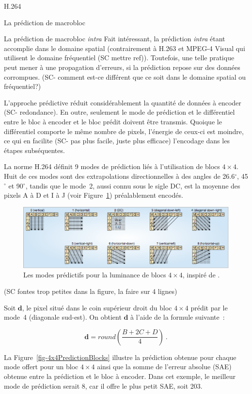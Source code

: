 \documentclass{article}
\begin{document}
\begin{section}{H.264}
\begin{subsection}{La prédiction de macrobloc}
\begin{subsubsection}{La prédiction de macrobloc \textit{intra}}
Fait intéressant, la prédiction \textit{intra} étant accomplie dans le domaine
spatial (contrairement à H.263 et MPEG-4 Visual qui utilisent le domaine
fréquentiel (SC mettre ref)). Toutefois, une telle pratique peut mener à une propagation
d'erreurs, si la prédiction repose sur des données corrompues. (SC- comment est-ce différent que ce soit dans le domaine spatial ou fréquentiel?)

L'approche prédictive réduit considérablement la quantité de données à 
encoder (SC- redondance). En outre, seulement le mode de prédiction et le différentiel entre le
bloc à encoder et le bloc prédit doivent être transmis. Quoique le différentiel 
comporte le même nombre de pixels, l'énergie de ceux-ci est moindre, ce qui en
facilite (SC- pas plus facile, juste plus efficace) l'encodage dans les étapes subséquentes.

La norme H.264 définit 9 modes de prédiction liés à l'utilisation de blocs 
$ 4 \times 4$. Huit de ces modes sont des extrapolations directionnelles à des
angles de 26.6$^\circ$, 45$^\circ$ et 90$^\circ$, tandis que le mode~2, aussi
connu sous le sigle DC, est la moyenne des pixels A à D et I à J (voir
Figure~\ref{fig-4x4PredictionModes}) préalablement encodés.

\begin{figure}[htb]
\centering
\includegraphics[width=\linewidth]{images/4x4PredictionModes.png}
\caption{Les modes prédictifs pour la luminance de blocs $4 \times 4$, inspiré
de \cite{richardson2003}.}
\label{fig-4x4PredictionModes}
\end{figure}
(SC fontes trop petites dans la figure, la faire sur 4 lignes)

Soit $\mathbf{d}$, le pixel situé dans le coin supérieur droit du bloc $4 
\times 4$ prédit par le mode~4 (diagonale sud-est). On obtient $\mathbf{d}$ à
l'aide de la formule suivante~:

\begin{equation}
\mathbf{d} = round \left(\frac{B + 2C + D}{4} \right)\:.
\end{equation}

La Figure~\ref{fig-4x4PredictionBlocks} illustre la prédiction obtenue pour
chaque mode offert pour un bloc $4 \times 4$ ainsi que la somme de l'erreur
absolue (SAE) obtenue entre la prédiction et le bloc à encoder. Dans cet exemple, le
meilleur mode de prédiction serait 8, car il offre le plus petit SAE, soit 203.


\end{subsubsection}
\end{subsection}
\end{section}
\end{document}
